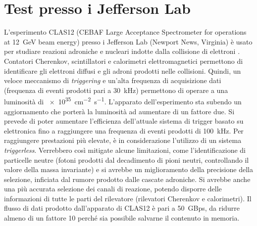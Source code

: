 \documentclass[../main.tex]{subfiles}
\begin{document}
\section{Test presso i Jefferson Lab}
\label{sct:jlab}
L'esperimento CLAS12 (CEBAF Large Acceptance Spectrometer for operations at \SI{12}{\GeV} beam energy) presso i Jefferson Lab (Newport News, Virginia) è usato per studiare reazioni adroniche e nucleari indotte dalla collisione di elettroni \cite{3x3telescope}. Contatori Cherenkov, scintillatori e calorimetri elettromagnetici permettono di identificare gli elettroni diffusi e gli adroni prodotti nelle collisioni. Quindi, un veloce meccanismo di \emph{triggering} e un'alta frequenza di acquisizione dati (frequenza di eventi prodotti pari a \SI{30}{\kilo\hertz}) permettono di operare a una luminosità di \SI{e35}{\cm^{-2}\s^{-1}}.
L'apparato dell'esperimento sta subendo un aggiornamento che porterà la luminosità ad aumentare di un fattore due. Si prevede di poter aumentare l'efficienza dell'attuale sistema di trigger basato su elettronica fino a raggiungere una frequenza di eventi prodotti di \SI{100}{\kilo\hertz}. Per raggiungere prestazioni più elevate, è in considerazione l'utilizzo di un sistema \emph{triggerless}. Verrebbero così mitigate alcune limitazioni, come l'identificazione di particelle neutre (fotoni prodotti dal decadimento di pioni neutri, controllando il valore della massa invariante) e si avrebbe un miglioramento della precisione della selezione, inficiata dal rumore prodotto dalle cascate adroniche. Si avrebbe anche una più accurata selezione dei canali di reazione, potendo disporre delle informazioni di tutte le parti del rilevatore (rilevatori Cherenkov e calorimetri). Il flusso di dati prodotto dall'apparato di CLAS12 è pari a \SI{50}{GBps}, da ridurre almeno di un fattore 10 perché sia possibile salvarne il contenuto in memoria.
\end{document}
